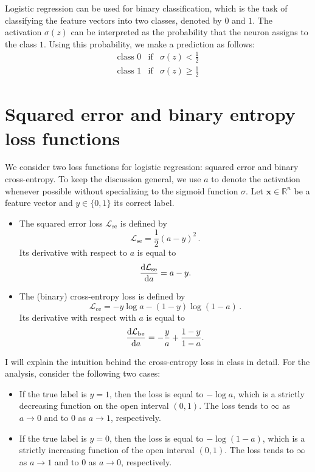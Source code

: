 \documentclass[12pt]{article}
\newcommand{\R}{\mathbb{R}}
\newcommand{\x}{\boldsymbol{x}}
\begin{document}
Logistic regression can be used for binary classification, which is the task of classifying the feature vectors into two classes, denoted by $0$ and $1$.
The activation $\sigma(z)$ can be interpreted as the probability that the neuron assigns to the class $1$. Using this probability, we make a prediction as follows:
\begin{eqnarray}
\mbox{class $0$} & \mbox{if} & \sigma(z) < \frac{1}{2} \\
\mbox{class $1$} & \mbox{if} & \sigma(z) \ge \frac{1}{2}
\end{eqnarray}

\section{Squared error and binary entropy loss functions}

We consider two loss functions for logistic regression: squared error and binary cross-entropy. 
To keep the discussion general, we use $a$ to denote the activation whenever possible without specializing to the sigmoid function $\sigma$.
Let $\x\in\R^n$ be a feature vector and $y\in\{0,1\}$ its correct label.

\begin{itemize}
\item The squared error loss $\mathcal{L}_\mathrm{se}$ is defined by
\begin{equation}
\mathcal{L}_\mathrm{se} = \frac{1}{2} (a - y)^2\,.
\end{equation}
Its derivative with respect to $a$ is equal to 
\begin{equation}
{\mathrm{d} \mathcal{L}_\mathrm{se} \over \mathrm{d} a} = a - y.
\end{equation}
%
%
%
\item The (binary) cross-entropy loss is defined by
\begin{equation}
\mathcal{L}_\mathrm{ce} = - y \log a - (1-y) \log(1-a)\,.
\end{equation}
Its derivative with respect with $a$ is equal to 
\begin{equation}
{\mathrm{d} \mathcal{L}_\mathrm{be} \over \mathrm{d} a} = -\frac{y}{a} + \frac{1-y}{1-a}.
\end{equation}
\end{itemize}

I will explain the intuition behind the cross-entropy loss in class in detail. For the analysis, consider the following two cases:
\begin{itemize}
\item If the true label is $y=1$, then the loss is equal to $-\log a$, which is a strictly decreasing function on the open interval $(0,1)$.  The loss tends to $\infty$ as $a\rightarrow 0$ and to $0$ as $a\rightarrow 1$, respectively.
\item If the true label is $y=0$, then the loss is equal to $-\log(1-a)$, which is a strictly increasing function of the open interval $(0,1)$.  The loss tends to $\infty$ as $a\rightarrow 1$ and to $0$ as $a\rightarrow 0$, respectively.
\end{itemize}
\end{document}
